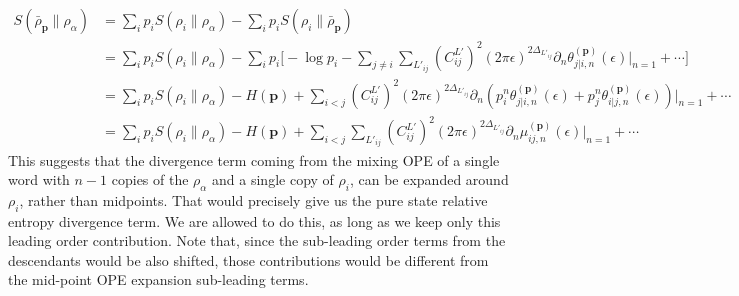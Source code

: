 \documentclass[11pt]{article}
\newcommand{\ep}{\epsilon}
\newcommand{\p}{\partial}
\newcommand{\lb}{\left(}
\newcommand{\rb}{\right)}
\begin{document}
\begin{align}
    S(\bar{\rho}_\textbf{p}\| \rho_\alpha) &= \sum_i p_i S(\rho_i \| \rho_\alpha) -\sum_i p_i S(\rho_i \|\bar \rho_\textbf{p}) \\ 
    &= \sum_i p_i S(\rho_i \| \rho_\alpha) - \sum_i p_i \Bigg[ -\log p_i  - \sum_{j\neq i}\sum_{L'_{ij}}\lb C_{ij}^{L'}\rb^2(2\pi\ep)^{2\Delta_{L'_{ij}}}\p_n \theta_{j|i,n}^{(\textbf{p})} (\ep)\Big|_{n=1}+\cdots\Bigg]\\
    &= \sum_i p_i S(\rho_i \| \rho_\alpha) -H(\textbf{p}) + \sum_{i<j}\lb C_{ij}^{L'}\rb^2(2\pi\ep)^{2\Delta_{L'_{ij}}} \p_n \lb p_i^n \theta_{j|i,n}^{(\textbf{p})} (\ep) + p_j^n \theta_{i|j,n}^{(\textbf{p})}(\ep)\rb\Big|_{n=1}+\cdots\\
    &=  \sum_i p_i S(\rho_i \| \rho_\alpha) -H(\textbf{p}) +  \sum_{i<j}\sum_{L'_{ij}}\lb C_{ij}^{L'}\rb^2(2\pi\ep)^{2\Delta_{L'_{ij}}}  \p_n \mu_{ij,n}^{(\textbf{p})}(\ep)\Big|_{n=1}+\cdots 
\end{align}
This suggests that the divergence term coming from the mixing OPE of a single word with $n-1$ copies of the $\rho_\alpha$ and a single copy of $\rho_i$, can be expanded around $\rho_i$, rather than midpoints. That would precisely give us the pure state relative entropy divergence term. We are allowed to do this, as long as we keep only this leading order contribution. Note that, since the sub-leading order terms from the descendants would be also shifted, those contributions would be different from the mid-point OPE expansion sub-leading terms. 
\end{document}
